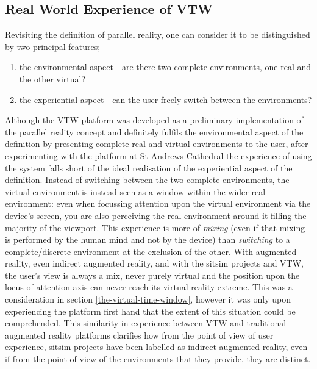 \subsection{Real World Experience of VTW}
\label{real-world-experience-of-vtw}
Revisiting the definition of parallel reality, one can consider it to be distinguished by two principal features;

\begin{enumerate}
	\item the environmental aspect - are there two complete environments, one real and the other virtual?
	\item the experiential aspect - can the user freely switch between the environments?
\end{enumerate}

Although the VTW platform was developed as a preliminary implementation of the parallel reality concept and definitely fulfils the environmental aspect of the definition by presenting complete real and virtual environments to the user, after experimenting with the platform at St Andrews Cathedral the experience of using the system falls short of the ideal realisation of the experiential aspect of the definition. Instead of switching between the two complete environments, the virtual environment is instead seen as a window within the wider real environment: even when focussing attention upon the virtual environment via the device's screen, you are also perceiving the real environment around it filling the majority of the viewport. This experience is more of \textit{mixing} (even if that mixing is performed by the human mind and not by the device) than \textit{switching} to a complete/discrete environment at the exclusion of the other. With augmented reality, even indirect augmented reality, and with the sitsim projects and VTW, the user's view is always a mix, never purely virtual and the position upon the locus of attention axis can never reach its virtual reality extreme. This was a consideration in section \ref{the-virtual-time-window}, however it was only upon experiencing the platform first hand that the extent of this situation could be comprehended. This similarity in experience between VTW and traditional augmented reality platforms clarifies how from the point of view of user experience, sitsim projects have been labelled as indirect augmented reality, even if from the point of view of the environments that they provide, they are distinct.


